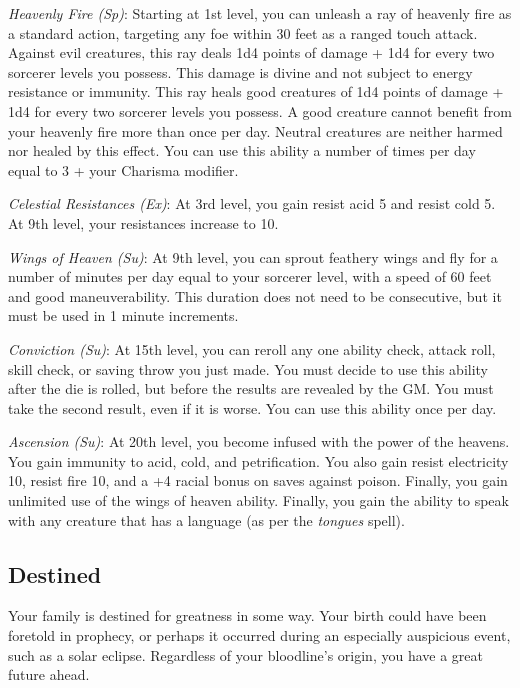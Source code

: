 \textit{Heavenly Fire (Sp)}: Starting at 1st level, you can unleash a ray of heavenly fire as a standard action, targeting any foe
within 30 feet as a ranged touch attack. Against evil creatures, this ray deals 1d4 points of damage + 1d4 for every two sorcerer
levels you possess. This damage is divine and not subject to energy resistance or immunity. This ray heals good creatures of 1d4
points of damage + 1d4 for every two sorcerer levels you possess. A good creature cannot benefit from your heavenly fire more than
once per day. Neutral creatures are neither harmed nor healed by this effect. You can use this ability a number of times per day
equal to 3 + your Charisma modifier.
				
\textit{Celestial Resistances (Ex)}: At 3rd level, you gain resist acid 5 and resist cold 5. At 9th level, your resistances increase
to 10.
				
\textit{Wings of Heaven (Su)}: At 9th level, you can sprout feathery wings and fly for a number of minutes per day equal to your
sorcerer level, with a speed of 60 feet and good maneuverability. This duration does not need to be consecutive, but it must be used
in 1 minute increments. 
				
\textit{Conviction (Su)}: At 15th level, you can reroll any one ability check, attack roll, skill check, or saving throw you just
made. You must decide to use this ability after the die is rolled, but before the results are revealed by the GM. You must take 
the second result, even if it is worse. You can use this ability once per day.
				
\textit{Ascension (Su)}: At 20th level, you become infused with the power of the heavens. You gain immunity to acid, cold, and 
petrification. You also gain resist electricity 10, resist fire 10, and a +4 racial bonus on saves against poison. Finally, you
gain unlimited use of the wings of heaven ability. Finally, you gain the ability to speak with any creature that has a language 
(as per the \textit{tongues }spell).
				
\subsection{Destined}

				
Your family is destined for greatness in some way. Your birth could have been foretold in prophecy, or perhaps it occurred during 
an especially auspicious event, such as a solar eclipse. Regardless of your bloodline's origin, you have a great future ahead.
				
